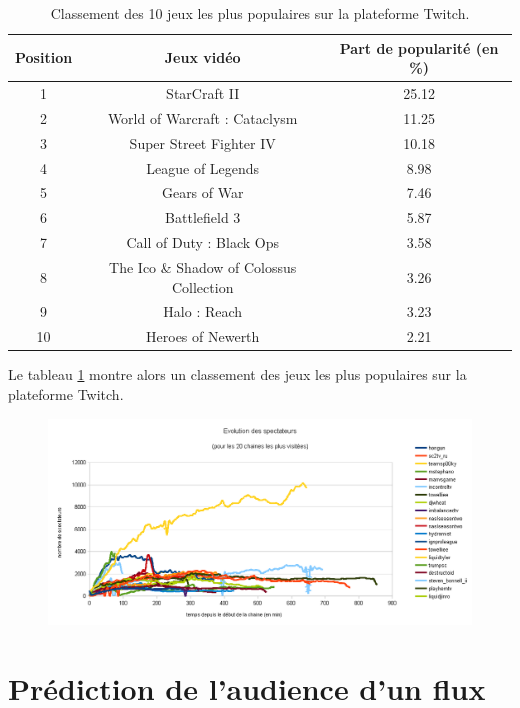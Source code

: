 \documentclass[11pt, a4paper, titlepage]{scrartcl}
\begin{document}
\begin{table}[c]
  \centering
   \caption{\label{tab:games_rank} Classement des 10 jeux les plus populaires
   sur la plateforme Twitch.}
   \begin{tabular}{|c|c|c|}
     \hline
     Position & Jeux vidéo & Part de popularité (en \%) \\
     \hline
     1 & StarCraft II & 25.12 \\
     2 & World of Warcraft : Cataclysm & 11.25 \\
     3 & Super Street Fighter IV & 10.18 \\
     4 & League of Legends & 8.98 \\
     5 & Gears of War & 7.46 \\
     6 & Battlefield 3 & 5.87 \\
     7 & Call of Duty : Black Ops & 3.58 \\
     8 & The Ico \& Shadow of Colossus Collection & 3.26 \\
     9 & Halo : Reach & 3.23 \\
     10 & Heroes of Newerth & 2.21 \\
     \hline
   \end{tabular}
\end{table}

Le tableau \ref{tab:games_rank} montre alors un classement des jeux les plus
populaires sur la plateforme Twitch.

\begin{figure}[h]
    \centering
    \includegraphics[width=\textwidth]{images/top_20_view_evolutions}
    \caption{}
\end{figure}

\section{Prédiction de l'audience d'un flux}
\end{document}
